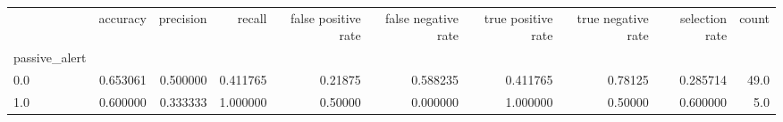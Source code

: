 \begin{tabular}{lrrrrrrrrr}
\toprule
{} &  accuracy &  precision &    recall &  false positive rate &  false negative rate &  true positive rate &  true negative rate &  selection rate &  count \\
passive\_alert &           &            &           &                      &                      &                     &                     &                 &        \\
\midrule
0.0           &  0.653061 &   0.500000 &  0.411765 &              0.21875 &             0.588235 &            0.411765 &             0.78125 &        0.285714 &   49.0 \\
1.0           &  0.600000 &   0.333333 &  1.000000 &              0.50000 &             0.000000 &            1.000000 &             0.50000 &        0.600000 &    5.0 \\
\bottomrule
\end{tabular}
